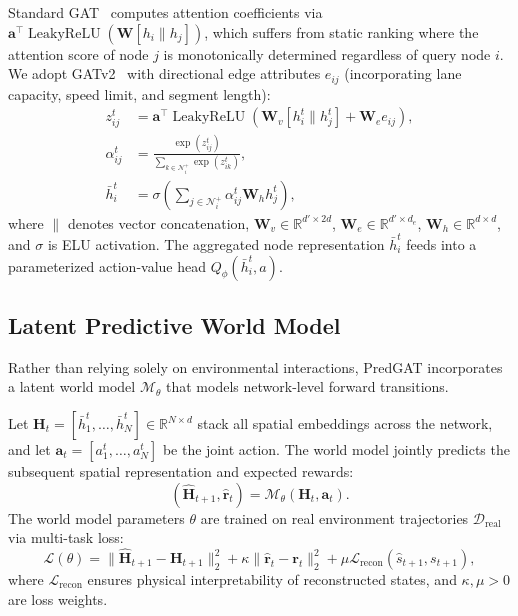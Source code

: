 \documentclass[11pt,a4paper,twocolumn]{article}
\begin{document}
Standard GAT~\cite{velickovic2018graph} computes attention coefficients via $\mathbf{a}^\top \operatorname{LeakyReLU}(\mathbf{W}[h_i \| h_j])$, which suffers from static ranking where the attention score of node $j$ is monotonically determined regardless of query node $i$. We adopt GATv2~\cite{brody2022gatv2} with directional edge attributes $e_{ij}$ (incorporating lane capacity, speed limit, and segment length):
\begin{align}
    z_{ij}^t &= \mathbf{a}^\top \operatorname{LeakyReLU}\left( \mathbf{W}_v [h_i^t \parallel h_j^t] + \mathbf{W}_e e_{ij} \right), \\
    \alpha_{ij}^t &= \frac{\exp(z_{ij}^t)}{\sum_{k \in \mathcal{N}_i^+} \exp(z_{ik}^t)}, \\
    \bar{h}_i^t &= \sigma\left( \sum_{j \in \mathcal{N}_i^+} \alpha_{ij}^t \mathbf{W}_h h_j^t \right),
\end{align}
where $\|$ denotes vector concatenation, $\mathbf{W}_v \in \mathbb{R}^{d' \times 2d}$, $\mathbf{W}_e \in \mathbb{R}^{d' \times d_e}$, $\mathbf{W}_h \in \mathbb{R}^{d \times d}$, and $\sigma$ is ELU activation. The aggregated node representation $\bar{h}_i^t$ feeds into a parameterized action-value head $Q_\phi(\bar{h}_i^t, a)$.

\subsection{Latent Predictive World Model}
Rather than relying solely on environmental interactions, PredGAT incorporates a latent world model $\mathcal{M}_\theta$ that models network-level forward transitions.

Let $\mathbf{H}_t = [\bar{h}_1^t, \dots, \bar{h}_N^t] \in \mathbb{R}^{N \times d}$ stack all spatial embeddings across the network, and let $\mathbf{a}_t = [a_1^t, \dots, a_N^t]$ be the joint action. The world model jointly predicts the subsequent spatial representation and expected rewards:
\begin{equation}
    (\widehat{\mathbf{H}}_{t+1}, \widehat{\mathbf{r}}_t) = \mathcal{M}_\theta(\mathbf{H}_t, \mathbf{a}_t).
\end{equation}
The world model parameters $\theta$ are trained on real environment trajectories $\mathcal{D}_{\text{real}}$ via multi-task loss:
\begin{equation}
    \mathcal{L}(\theta) = \|\widehat{\mathbf{H}}_{t+1} - \mathbf{H}_{t+1}\|_2^2 + \kappa \|\widehat{\mathbf{r}}_t - \mathbf{r}_t\|_2^2 + \mu \mathcal{L}_{\text{recon}}(\widehat{s}_{t+1}, s_{t+1}),
\end{equation}
where $\mathcal{L}_{\text{recon}}$ ensures physical interpretability of reconstructed states, and $\kappa, \mu > 0$ are loss weights.
\end{document}
